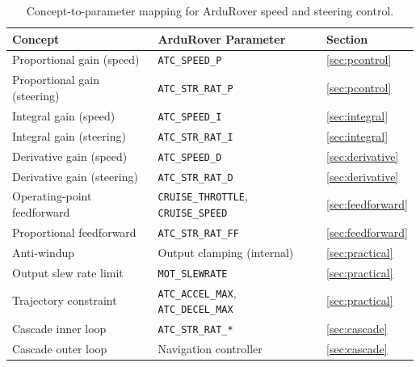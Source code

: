 \documentclass[12pt]{article}
\begin{document}
\begin{table}[htbp]
\centering
\caption{Concept-to-parameter mapping for ArduRover speed and steering control.}
\label{tab:summary}
\begin{tabular}{lll}
\toprule
Concept & ArduRover Parameter & Section \\
\midrule
Proportional gain (speed)    & \texttt{ATC\_SPEED\_P}                             & \cref{sec:pcontrol} \\
Proportional gain (steering) & \texttt{ATC\_STR\_RAT\_P}                          & \cref{sec:pcontrol} \\
Integral gain (speed)        & \texttt{ATC\_SPEED\_I}                             & \cref{sec:integral} \\
Integral gain (steering)     & \texttt{ATC\_STR\_RAT\_I}                          & \cref{sec:integral} \\
Derivative gain (speed)      & \texttt{ATC\_SPEED\_D}                             & \cref{sec:derivative} \\
Derivative gain (steering)   & \texttt{ATC\_STR\_RAT\_D}                          & \cref{sec:derivative} \\
Operating-point feedforward  & \texttt{CRUISE\_THROTTLE}, \texttt{CRUISE\_SPEED}  & \cref{sec:feedforward} \\
Proportional feedforward     & \texttt{ATC\_STR\_RAT\_FF}                         & \cref{sec:feedforward} \\
Anti-windup                  & Output clamping (internal)                         & \cref{sec:practical} \\
Output slew rate limit       & \texttt{MOT\_SLEWRATE}                             & \cref{sec:practical} \\
Trajectory constraint        & \texttt{ATC\_ACCEL\_MAX}, \texttt{ATC\_DECEL\_MAX} & \cref{sec:practical} \\
Cascade inner loop           & \texttt{ATC\_STR\_RAT\_*}                          & \cref{sec:cascade} \\
Cascade outer loop           & Navigation controller                              & \cref{sec:cascade} \\
\bottomrule
\end{tabular}
\end{table}
\end{document}
